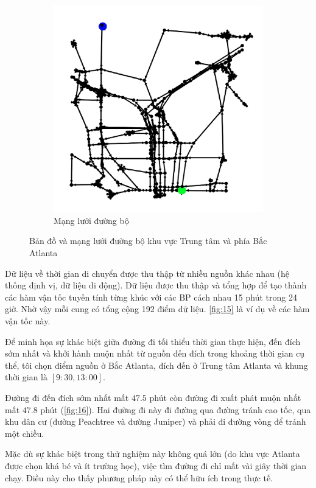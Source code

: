 \documentclass[../main.tex]{subfiles}
\begin{document}
\begin{figure}
\begin{subfigure}{0.45\textwidth}
        \includegraphics{edited-images/Figure14b.jpg}
        \caption{Mạng lưới đường bộ}
        \label{fig:14b}
    \end{subfigure}
    \caption{Bản đồ và mạng lưới đường bộ khu vực Trung tâm và phía Bắc Atlanta}
    \label{fig:14}
\end{figure}

Dữ liệu về thời gian di chuyển được thu thập từ nhiều nguồn khác nhau
(hệ thống định vị, dữ liệu di động). Dữ liệu được thu thập và tổng hợp
để tạo thành các hàm vận tốc tuyến tính từng khúc với các BP
cách nhau 15 phút trong 24 giờ. Nhờ vậy mỗi cung có tổng cộng 192 điểm
dữ liệu. \autoref{fig:15} là ví dụ về các hàm vận tốc
này.


Để minh họa sự khác biệt giữa đường đi tối thiểu thời gian thực hiện,
đến đích sớm nhất và khởi hành muộn nhất từ nguồn đến đích trong khoảng
thời gian cụ thể, tôi chọn điểm nguồn ở Bắc Atlanta, đích đến ở Trung
tâm Atlanta và khung thời gian là \([9:30, 13:00]\).


Đường đi đến đích sớm nhất mất \(47.5\) phút còn đường đi xuất
phát muộn nhất mất \(47.8\) phút (\autoref{fig:16}). Hai đường đi này đi đường qua đường 
tránh cao tốc, qua khu dân cư (đường Peachtree và đường Juniper) và phải đi đường vòng
để tránh một chiều.

Mặc dù sự khác biệt trong thử nghiệm này không quá lớn (do khu vực
Atlanta được chọn khá bé và ít trường học), việc tìm đường đi chỉ mất
vài giây thời gian chạy. Điều này cho thấy phương pháp này có thể hữu
ích trong thực tế.
\end{document}
